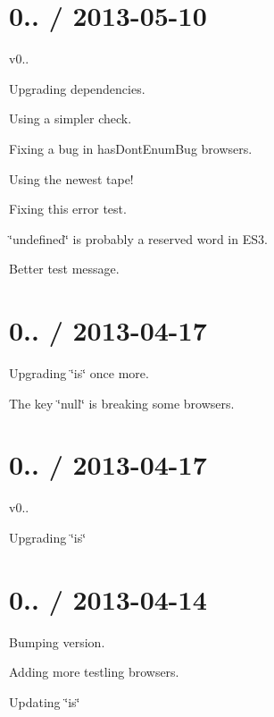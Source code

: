 \section*{0.. / 2013-\/05-\/10 }


\begin{DoxyItemize}
\item v0..
\item Upgrading dependencies.
\item Using a simpler check.
\item Fixing a bug in has\+Dont\+Enum\+Bug browsers.
\item Using the newest tape!
\item Fixing this error test.
\item \char`\"{}undefined\char`\"{} is probably a reserved word in E\+S3.
\item Better test message.
\end{DoxyItemize}

\section*{0.. / 2013-\/04-\/17 }


\begin{DoxyItemize}
\item Upgrading \char`\"{}is\char`\"{} once more.
\item The key \char`\"{}null\char`\"{} is breaking some browsers.
\end{DoxyItemize}

\section*{0.. / 2013-\/04-\/17 }


\begin{DoxyItemize}
\item v0..
\item Upgrading \char`\"{}is\char`\"{}
\end{DoxyItemize}

\section*{0.. / 2013-\/04-\/14 }


\begin{DoxyItemize}
\item Bumping version.
\item Adding more testling browsers.
\item Updating \char`\"{}is\char`\"{}
\end{DoxyItemize}

